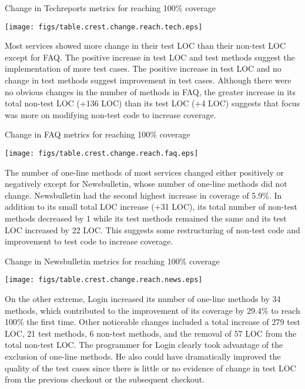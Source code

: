 \begin{table}[htbp]
  \begin{center}
    \caption{Change in Techreports metrics for reaching 100\% coverage}
    \texttt{[image: figs/table.crest.change.reach.tech.eps]}
  \end{center}
\end{table}

Most services showed more change in their test LOC than their non-test LOC
except for FAQ.  The positive increase in test LOC and test methods suggest
the implementation of more test cases.  The positive increase in test LOC
and no change in test methods suggest improvement in test cases.  Although
there were no obvious changes in the number of methods in FAQ, the greater
increase in its total non-test LOC (+136 LOC) than its test LOC (+4 LOC)
suggests that focus was more on modifying non-test code to increase
coverage.

\begin{table}[htbp]
  \begin{center}
    \caption{Change in FAQ metrics for reaching 100\% coverage}
    \texttt{[image: figs/table.crest.change.reach.faq.eps]}
  \end{center}
\end{table}

The number of one-line methods of most services changed either positively
or negatively except for Newsbulletin, whose number of one-line methods did
not change.  Newsbulletin had the second highest increase in coverage of
5.9\%.  In addition to its small total LOC increase (+31 LOC), its total
number of non-test methods decreased by 1 while its test methods remained
the same and its test LOC increased by 22 LOC.  This suggests some
restructuring of non-test code and improvement to test code to increase
coverage.

\begin{table}[htbp]
  \begin{center}
    \caption{Change in Newsbulletin metrics for reaching 100\% coverage}
    \texttt{[image: figs/table.crest.change.reach.news.eps]}
  \end{center}
\end{table}

On the other extreme, Login increased its number of one-line methods by 34
methods, which contributed to the improvement of its coverage by 29.4\% to
reach 100\% the first time.  Other noticeable changes included a total
increase of 279 test LOC, 21 test methods, 6 non-test methods, and the
removal of 57 LOC from the total non-test LOC.  The programmer for Login
clearly took advantage of the exclusion of one-line methods.  He also could
have dramatically improved the quality of the test cases since there is
little or no evidence of change in test LOC from the previous checkout or
the subsequent checkout.

